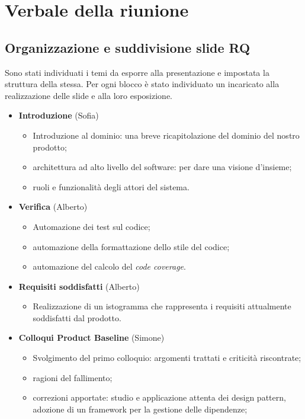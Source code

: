 \section{Verbale della riunione}
\subsection{Organizzazione e suddivisione slide RQ}

Sono stati individuati i temi da esporre alla presentazione e impostata la struttura della stessa. Per ogni blocco è stato individuato un incaricato alla realizzazione delle slide e alla loro esposizione.

\begin{itemize}
	\item \textbf{Introduzione} (Sofia)
	\begin{itemize}
		\item Introduzione al dominio: una breve ricapitolazione del dominio del nostro prodotto;
		\item architettura ad alto livello del software: per dare una visione d'insieme;
		\item ruoli e funzionalità degli attori del sistema.
	\end{itemize}
	\item \textbf{Verifica} (Alberto)
	\begin{itemize}
		\item Automazione dei test sul codice;
		\item automazione della formattazione dello stile del codice;
		\item automazione del calcolo del \textit{code coverage}.
	\end{itemize}
	\item \textbf{Requisiti soddisfatti} (Alberto)
	\begin{itemize}
		\item Realizzazione di un istogramma che rappresenta i requisiti attualmente soddisfatti dal prodotto.
	\end{itemize}
	\item \textbf{Colloqui Product Baseline} (Simone)
	\begin{itemize}
		\item Svolgimento del primo colloquio: argomenti trattati e criticità riscontrate;
		\item ragioni del fallimento;
		\item correzioni apportate: studio e applicazione attenta dei design pattern, adozione di un framework per la gestione delle dipendenze;

\end{itemize}
\end{itemize}
